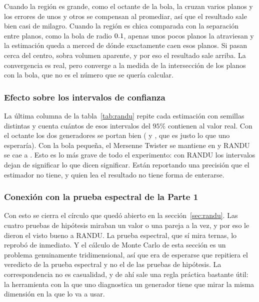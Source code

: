 \documentclass[11pt,letterpaper]{article}
\begin{document}
Cuando la región es grande, como el octante de la bola, la cruzan varios
planos y los errores de unos y otros se compensan al promediar, así que el
resultado sale bien casi de milagro. Cuando la región es chica comparada con
la separación entre planos, como la bola de radio $0.1$, apenas unos
pocos planos la atraviesan y la estimación queda a merced de dónde
exactamente caen esos planos. Si pasan cerca del centro, sobra volumen
aparente, y por eso el resultado sale \RelativoRanduBola{} arriba. La
convergencia es real, pero converge a la medida de la intersección de los
planos con la bola, que no es el número que se quería calcular.

\subsubsection{Efecto sobre los intervalos de confianza} La última
columna de la tabla~\ref{tab:randu} repite cada estimación con \KRandu{}
semillas distintas y cuenta cuántos de esos intervalos del $95\%$ contienen
al valor real. Con el octante los dos generadores se portan bien
(\CoberturaRanduOctante{} y \CoberturaMTOctante, que es justo lo que uno
esperaría). Con la bola pequeña, el Mersenne Twister se mantiene en
\CoberturaMTBola{} y RANDU se cae a \CoberturaRanduBola. Esto es lo más grave
de todo el experimento: con RANDU los intervalos dejan de
significar lo que dicen significar. Están reportando una precisión que el
estimador no tiene, y quien lea el resultado no tiene forma de enterarse.

\subsubsection{Conexión con la prueba espectral de la Parte 1} Con esto se cierra el
círculo que quedó abierto en la sección~\ref{sec:randu}. Las cuatro pruebas
de hipótesis miraban un valor o una pareja a la vez, y por eso le dieron el
visto bueno a RANDU. La prueba espectral, que sí mira ternas, lo reprobó de
inmediato. Y el cálculo de Monte Carlo de esta sección es un problema
genuinamente tridimensional, así que era de esperarse que repitiera el
veredicto de la prueba espectral y no el de las pruebas de hipótesis. La
correspondencia no es casualidad, y de ahí sale una regla práctica bastante
útil: la herramienta con la que uno diagnostica un generador tiene que mirar
la misma dimensión en la que lo va a usar.

\newpage
\end{document}
